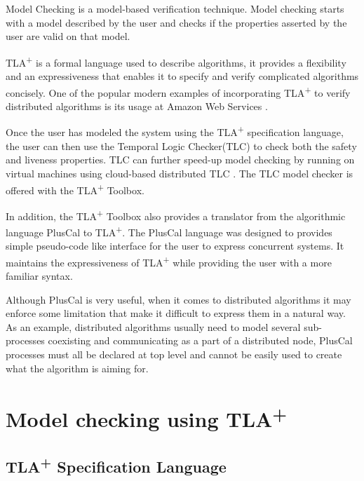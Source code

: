 \documentclass{article}
\newcommand{\tlaplus}{TLA\textsuperscript{+}\xspace}
\begin{document}
Model Checking \cite{ModelCheckingTLA} is a model-based verification technique. Model checking starts with a model described by the user and checks if the properties asserted by the user are valid on that model. 

\tlaplus is a formal language used to describe algorithms, it provides a flexibility and an expressiveness that enables it to specify and verify complicated algorithms concisely. One of the popular modern examples of incorporating \tlaplus to verify distributed algorithms is its usage at Amazon Web Services \cite{amazon}.

Once the user has modeled the system using the \tlaplus specification language, the user can then use the Temporal Logic Checker(TLC) to check both the safety and liveness properties. TLC can further speed-up model checking by running on virtual machines using cloud-based distributed TLC \cite{cloudTLC}. The TLC model checker is offered with the \tlaplus Toolbox. 

In addition, the \tlaplus Toolbox also provides a translator from the algorithmic language PlusCal to \tlaplus. The PlusCal language was designed to provides simple pseudo-code like interface for the user to express concurrent systems. It maintains the expressiveness of \tlaplus while providing the user with a more familiar syntax.

Although PlusCal is very useful, when it comes to distributed algorithms it may enforce some limitation that make it difficult to express them in a natural way. As an example, distributed algorithms usually need to model several sub-processes coexisting and communicating as a part of a distributed node, PlusCal processes must all be declared at top level and cannot be easily used to create what the algorithm is aiming for. 

\section{Model checking using \tlaplus}
\subsection{\tlaplus Specification Language}
\end{document}
